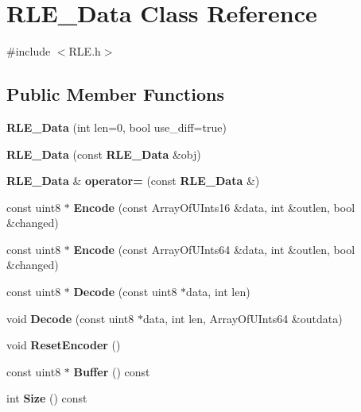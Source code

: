 \section{RLE\_\-Data Class Reference}
\label{classRLE__Data}


{\ttfamily \#include $<$RLE.h$>$}\subsection*{Public Member Functions}
\begin{DoxyCompactItemize}
\item 
{\bfseries RLE\_\-Data} (int len=0, bool use\_\-diff=true)\label{classRLE__Data_a61f10cbdcbc3a7f2a1aa4fd3722cf48e}

\item 
{\bfseries RLE\_\-Data} (const {\bf RLE\_\-Data} \&obj)\label{classRLE__Data_aa764c13086ea49b1d7c2359f0ce15430}

\item 
{\bf RLE\_\-Data} \& {\bfseries operator=} (const {\bf RLE\_\-Data} \&)\label{classRLE__Data_ae705d9419278504d7a0a74d28051dc6d}

\item 
const uint8 $\ast$ {\bfseries Encode} (const ArrayOfUInts16 \&data, int \&outlen, bool \&changed)\label{classRLE__Data_a38318f35235a1f3c9b1872e86003404a}

\item 
const uint8 $\ast$ {\bfseries Encode} (const ArrayOfUInts64 \&data, int \&outlen, bool \&changed)\label{classRLE__Data_ab1586279b4564812c789889a133210c6}

\item 
const uint8 $\ast$ {\bfseries Decode} (const uint8 $\ast$data, int len)\label{classRLE__Data_aec57e6045f16a8ac986aed276da4ae00}

\item 
void {\bfseries Decode} (const uint8 $\ast$data, int len, ArrayOfUInts64 \&outdata)\label{classRLE__Data_a823d487c09c0f2eff20a67a2c7afb951}

\item 
void {\bfseries ResetEncoder} ()\label{classRLE__Data_af243518ad706ecd35ea75fff09a260f2}

\item 
const uint8 $\ast$ {\bfseries Buffer} () const \label{classRLE__Data_a4482e3c6e106325c723cf4f7eb397947}

\item 
int {\bfseries Size} () const \label{classRLE__Data_a9e9f20ee1271b6c7707dfd47168c4884}

\end{DoxyCompactItemize}
